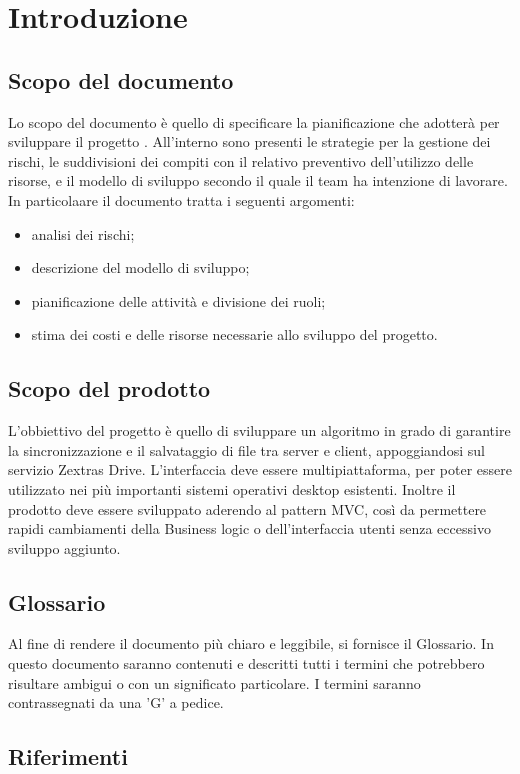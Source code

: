 \section{Introduzione}
\subsection{Scopo del documento}
Lo scopo del documento è quello di specificare la pianificazione che \Gruppo  adotterà per sviluppare il progetto \NomeProgetto. All'interno sono presenti le strategie per la gestione dei rischi, le suddivisioni dei compiti con il relativo preventivo dell'utilizzo delle risorse, e il modello di sviluppo secondo il quale il team ha intenzione di lavorare.
In particolaare il documento tratta i seguenti argomenti:
\begin{itemize}
\item analisi dei rischi;
\item descrizione del modello di sviluppo;
\item pianificazione delle attività e divisione dei ruoli;
\item stima dei costi e delle risorse necessarie allo sviluppo del progetto.
\end{itemize}
\subsection{Scopo del prodotto}
L'obbiettivo del progetto è quello di sviluppare un algoritmo in grado di garantire la sincronizzazione e il salvataggio di file tra server e client, appoggiandosi sul servizio Zextras Drive.
L'interfaccia deve essere multipiattaforma, per poter essere utilizzato nei più importanti sistemi operativi desktop esistenti.
Inoltre il prodotto deve essere sviluppato aderendo al pattern MVC, così da permettere rapidi cambiamenti della Business logic o dell'interfaccia utenti senza eccessivo sviluppo aggiunto.
\subsection{Glossario}
Al fine di rendere il documento più chiaro e leggibile, si fornisce il Glossario. In questo documento saranno contenuti e descritti tutti i termini che potrebbero risultare ambigui o con un significato particolare. I termini saranno contrassegnati da una 'G' a pedice.
\subsection{Riferimenti}
